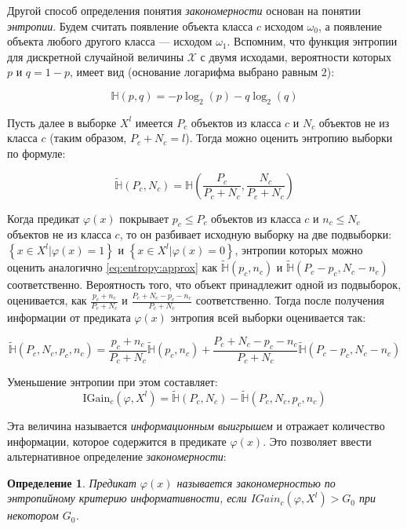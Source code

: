 \documentclass[12pt]{article}
\newtheorem{definition}{Определение}
\begin{document}
Другой способ определения понятия \emph{закономерности} основан на
понятии \emph{энтропии}. Будем считать появление объекта класса \(c\)
исходом \(\omega_0\), а появление объекта любого другого класса ---
исходом \(\omega_1\). Вспомним, что функция энтропии для дискретной
случайной величины \(\mathcal{X}\) с двумя исходами, вероятности
которых \(p \text{ и } q = 1 - p\), имеет вид (основание логарифма
выбрано равным \(2\)):

\[\mathbb{H}(p, q) = -p\log_2(p)-q\log_2(q)\]

Пусть далее в выборке \(X^l\) имеется \(P_c\) объектов из класса \(c\)
и \(N_c\) объектов не из класса \(c\) (таким образом, \(P_c + N_c =
l\)). Тогда можно оценить энтропию выборки по формуле:

\begin{equation}\label{eq:entropy:approx}
\tilde{\mathbb{H}}(P_c, N_c) =
\mathbb{H}\left(\frac{P_c}{P_c+N_c},\frac{N_c}{P_c+N_c}\right)
\end{equation}

Когда предикат \(\varphi(x)\) покрывает \(p_c\leq P_c\) объектов из
класса \(c\) и \(n_c\leq N_c\) объектов не из класса \(c\), то он
разбивает исходную выборку на две подвыборки: \(\left\{x\in X^l |
\varphi(x) = 1\right\}\) и \(\left\{x\in X^l | \varphi(x) =
0\right\}\), энтропии которых можно оценить аналогично
\ref{eq:entropy:approx} как \(\tilde{\mathbb{H}}(p_c, n_c)\) и
\(\tilde{\mathbb{H}}(P_c - p_c, N_c - n_c)\)
соответственно. Вероятность того, что объект принадлежит одной из
подвыборок, оценивается, как \(\frac{p_c + n_c}{P_c + N_c}\) и
\(\frac{P_c + N_c - p_c - n_c}{P_c + N_c}\) соответственно. Тогда
после получения информации от предиката \(\varphi(x)\) энтропия всей
выборки оценивается так:

\[
\tilde{\mathbb{H}}(P_c, N_c, p_c, n_c) =
\frac{p_c + n_c}{P_c + N_c}\tilde{\mathbb{H}}(p_c, n_c) +
\frac{P_c+N_c-p_c-n_c}{P_c+N_c}\tilde{\mathbb{H}}(P_c - p_c, N_c - n_c)
\]

Уменьшение энтропии при этом составляет:
\[
\text{IGain}_c(\varphi, X^l) =
\tilde{\mathbb{H}}(P_c, N_c) - \tilde{\mathbb{H}}(P_c, N_c, p_c, n_c)
\]

Эта величина называется \emph{информационным выигрышем} и отражает
количество информации, которое содержится в предикате
\(\varphi(x)\). Это позволяет ввести альтернативное определение
\emph{закономерности}:

\begin{definition}
  Предикат \(\varphi(x)\) называется закономерностью по энтропийному
  критерию информативности, если \(IGain_c (\varphi, X^l) > G_0\) при
  некотором \(G_0\).
\end{definition}
\end{document}
